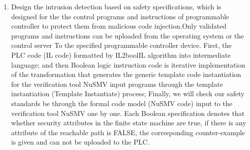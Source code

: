 \begin{englishabstract}
\begin{enumerate}
\item Design the intrusion detection based on safety specifications, which is designed for the the control programs and instructions of programmable controller  to protect them from malicious code injection.Only validated programs and instructions can be uploaded from the operating system or the control server To the specified programmable controller device. First, the PLC code (IL code) formatted by IL2boolIL algorithm into intermediate language; and then Boolean logic instruction code is iterative implementation of the transformation that generates the generic template code instantiation for the verification tool NuSMV input programs through the template instantiation (Template Instantiate) process; Finally, we will check our safety standards be through the formal code model (NuSMV code) input to the verification tool NuSMV one by one. Each Boolean specification denotes that whether security attributes in the finite state machine are true, if there is any attribute of the reachable path is FALSE, the corresponding counter-example is given and can not be uploaded to the PLC.
\end{enumerate}

\end{englishabstract}

